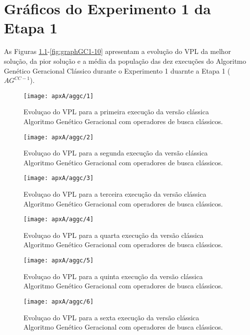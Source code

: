 \chapter{Gráficos do Experimento 1 da Etapa 1}

As Figuras \ref{fig:graphGC1-01}-\ref{fig:graphGC1-10} apresentam a evolução do VPL da melhor solução, da pior solução e a média da população das dez execuções do Algoritmo Genético Geracional Clássico durante o Experimento 1 duarnte a Etapa 1 ($AG^{CC-1}$).

\begin{figure}[H]
\centering
\texttt{[image: apxA/aggc/1]}
\caption{Evoluçao do VPL para a primeira execução da versão clássica Algoritmo Genético Geracional com operadores de busca clássicos.}
\label{fig:graphGC1-01}
\end{figure}

\begin{figure}[H]
\centering
\texttt{[image: apxA/aggc/2]}
\caption{Evoluçao do VPL para a segunda execução da versão clássica Algoritmo Genético Geracional com operadores de busca clássicos.}
\label{fig:graphGC1-02}
\end{figure}

\begin{figure}[H]
\centering
\texttt{[image: apxA/aggc/3]}
\caption{Evoluçao do VPL para a terceira execução da versão clássica Algoritmo Genético Geracional com operadores de busca clássicos.}
\label{fig:graphGC1-03}
\end{figure}

\begin{figure}[H]
\centering
\texttt{[image: apxA/aggc/4]}
\caption{Evoluçao do VPL para a quarta execução da versão clássica Algoritmo Genético Geracional com operadores de busca clássicos.}
\label{fig:graphGC1-04}
\end{figure}

\begin{figure}[htb]
\centering
\texttt{[image: apxA/aggc/5]}
\caption{Evoluçao do VPL para a quinta execução da versão clássica Algoritmo Genético Geracional com operadores de busca clássicos.}
\label{fig:graphGC1-05}
\end{figure}


\begin{figure}[H]
\centering
\texttt{[image: apxA/aggc/6]}
\caption{Evoluçao do VPL para a sexta execução da versão clássica Algoritmo Genético Geracional com operadores de busca clássicos.}
\label{fig:graphGC1-06}
\end{figure}

